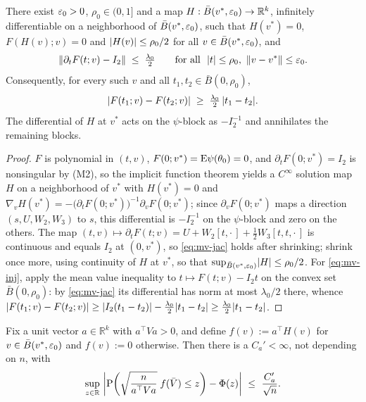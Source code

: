\begin{lemma}\label{lem:mv-ift}
There exist $\eps_{0}>0$, $\rho_{0}\in(0,1]$ and a map $H:\bar B(v^{*},\eps_{0})\to\mathbb{R}^{k}$, infinitely differentiable on a neighborhood of $\bar B(v^{*},\eps_{0})$, such that $H(v^{*})=0$, $F(H(v);v)=0$ and $\abs{H(v)}\le\rho_{0}/2$ for all $v\in\bar B(v^{*},\eps_{0})$, and
\begin{equation}\label{eq:mv-jac}
\norm*{\partial_{t}F(t;v)-I_{2}}\;\le\;\tfrac{\lambda_{0}}{2}
\qquad\text{for all }\ \abs{t}\le\rho_{0},\ \norm{v-v^{*}}\le\eps_{0}.
\end{equation}
Consequently, for every such $v$ and all $t_{1},t_{2}\in\bar B(0,\rho_{0})$,
\begin{equation}\label{eq:mv-inj}
\abs*{F(t_{1};v)-F(t_{2};v)}\;\ge\;\tfrac{\lambda_{0}}{2}\,\abs{t_{1}-t_{2}} .
\end{equation}
The differential of $H$ at $v^{*}$ acts on the $\psi$-block as $-I_{2}^{-1}$ and annihilates the remaining blocks.
\end{lemma}

\begin{proof}
$F$ is polynomial in $(t,v)$, $F(0;v^{*})=\E\psi(\theta_{0})=0$, and $\partial_{t}F(0;v^{*})=I_{2}$ is nonsingular by (M2), so the implicit function theorem yields a $C^{\infty}$ solution map $H$ on a neighborhood of $v^{*}$ with $H(v^{*})=0$ and $\nabla_{v}H(v^{*})=-\big(\partial_{t}F(0;v^{*})\big)^{-1}\partial_{v}F(0;v^{*})$; since $\partial_{v}F(0;v^{*})$ maps a direction $(s,U,W_{2},W_{3})$ to $s$, this differential is $-I_{2}^{-1}$ on the $\psi$-block and zero on the others. The map $(t,v)\mapsto\partial_{t}F(t;v)=U+W_{2}[t,\cdot\,]+\tfrac12 W_{3}[t,t,\cdot\,]$ is continuous and equals $I_{2}$ at $(0,v^{*})$, so \eqref{eq:mv-jac} holds after shrinking; shrink once more, using continuity of $H$ at $v^{*}$, so that $\sup_{\bar B(v^{*},\eps_{0})}\abs{H}\le\rho_{0}/2$. For \eqref{eq:mv-inj}, apply the mean value inequality to $t\mapsto F(t;v)-I_{2}t$ on the convex set $\bar B(0,\rho_{0})$: by \eqref{eq:mv-jac} its differential has norm at most $\lambda_{0}/2$ there, whence
$\abs{F(t_{1};v)-F(t_{2};v)}\ge\abs{I_{2}(t_{1}-t_{2})}-\tfrac{\lambda_{0}}{2}\abs{t_{1}-t_{2}}\ge\tfrac{\lambda_{0}}{2}\abs{t_{1}-t_{2}}$.
\end{proof}

\begin{lemma}\label{lem:mv-proxy}
Fix a unit vector $a\in\mathbb{R}^{k}$ with $a^{\top}Va>0$, and define $f(v):=a^{\top}H(v)$ for $v\in\bar B(v^{*},\eps_{0})$ and $f(v):=0$ otherwise. Then there is a $C_{a}'<\infty$, not depending on $n$, with
\[
\sup_{z\in\mathbb{R}}\ \abs*{\Prob\paren*{\sqrt{\frac{n}{a^{\top}Va}}\;f(\bar V)\le z}-\Phi(z)}\ \le\ \frac{C_{a}'}{\sqrt{n}} .
\]
\end{lemma}

